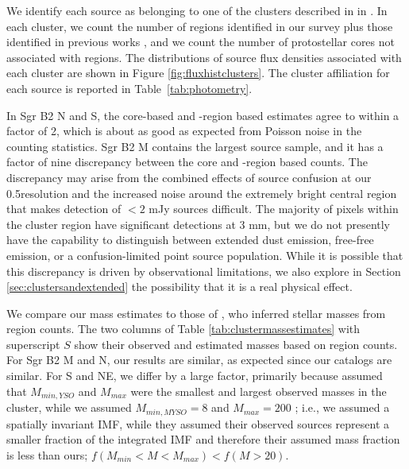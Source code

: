 \documentclass[twocolumn]{aastex61}
\begin{document}

We identify each source as belonging to one of the clusters described in in
\citet[][see Figure \ref{fig:overview}]{Schmiedeke2016a}. In each cluster, we
count the number of \hii regions identified in our survey plus those identified
in previous works \citep{Gaume1995a,De-Pree1996a}, and we count the number of
protostellar cores not associated with \hii regions.  The distributions of
source flux densities associated with each cluster are shown in Figure
\ref{fig:fluxhistclusters}.  The cluster affiliation for each source is
reported in Table~\ref{tab:photometry}.

In Sgr B2 N and S, the core-based
and \hii-region based estimates agree to within a factor of 2, which is about
as good as expected from Poisson noise in the counting statistics.  
Sgr B2 M contains the largest source sample, and it has a factor of nine
discrepancy between the core and \hii-region based counts. The discrepancy
may arise from the combined effects of source
confusion at our 0.5\arcsec resolution and the increased noise around the
extremely bright central region that makes detection of $<2$ mJy sources
difficult.  The majority of pixels within the cluster region have significant
detections at 3 mm, but we do not presently have the capability to distinguish
between extended dust emission, free-free emission, or a confusion-limited
point source population.  While it is possible that this discrepancy
is driven by observational limitations, we also explore in Section
\ref{sec:clustersandextended} the possibility that it is a real physical
effect.

We compare our mass estimates to those of \citet{Schmiedeke2016a}, who inferred
stellar masses from \hii region counts.  The  two columns of Table
\ref{tab:clustermassestimates} with superscript $S$ show their observed and
estimated masses based on
\hii region counts.  For Sgr B2 M and N, our results are similar, as expected
since our catalogs are similar.  For S and NE, we differ by a large factor,
primarily because \citet{Schmiedeke2016a} assumed that $M_{min,YSO}$ and $M_{max}$
were the smallest and largest observed masses in the cluster, while we assumed
$M_{min,MYSO}=8$ \msun and $M_{max}=200$ \msun; i.e., we assumed a spatially
invariant IMF, while they assumed their observed sources represent a smaller
fraction of the integrated IMF and therefore their assumed mass fraction is
less than ours; $f(M_{min}< M < M_{max}) < f(M>20)$.


\end{document}
